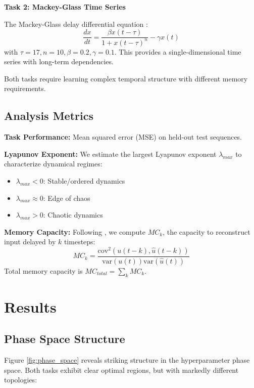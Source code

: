 \documentclass[11pt]{article}
\begin{document}
\textbf{Task 2: Mackey-Glass Time Series}

The Mackey-Glass delay differential equation \cite{mackey1977oscillation}:
\begin{equation}
    \frac{dx}{dt} = \frac{\beta x(t-\tau)}{1 + x(t-\tau)^n} - \gamma x(t)
\end{equation}
with $\tau=17, n=10, \beta=0.2, \gamma=0.1$. This provides a single-dimensional time series with long-term dependencies.

Both tasks require learning complex temporal structure with different memory requirements.

\subsection{Analysis Metrics}

\textbf{Task Performance:} Mean squared error (MSE) on held-out test sequences.

\textbf{Lyapunov Exponent:} We estimate the largest Lyapunov exponent $\lambda_{max}$ to characterize dynamical regimes:
\begin{itemize}
    \item $\lambda_{max} < 0$: Stable/ordered dynamics
    \item $\lambda_{max} \approx 0$: Edge of chaos
    \item $\lambda_{max} > 0$: Chaotic dynamics
\end{itemize}

\textbf{Memory Capacity:} Following \cite{jaeger2001short}, we compute $MC_k$, the capacity to reconstruct input delayed by $k$ timesteps:
\begin{equation}
    MC_k = \frac{\text{cov}^2(u(t-k), \hat{u}(t-k))}{\text{var}(u(t))\text{var}(\hat{u}(t))}
\end{equation}
Total memory capacity is $MC_{total} = \sum_k MC_k$.

\section{Results}

\subsection{Phase Space Structure}

Figure \ref{fig:phase_space} reveals striking structure in the hyperparameter phase space. Both tasks exhibit clear optimal regions, but with markedly different topologies:
\end{document}

